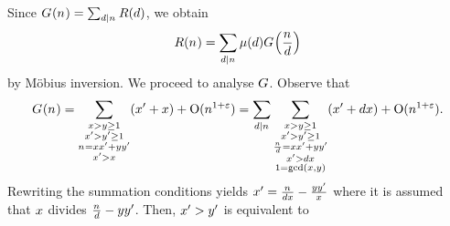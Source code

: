   Since %
  $\TheQuantityOf{\Size} =  \Sum[\TheDivisor\divides\Size]{
    \InvQuantityOf{\TheDivisor}
  }$,  
  we obtain
  \begin{equation}\label{mobius}
    \InvQuantityOf{\Size} =
    \Sum[\TheDivisor\divides\Size]{
      \MoebiusOf{\TheDivisor}
      \TheQuantityOf{\frac{\Size}{\TheDivisor}}
    }
  \end{equation}
  by Möbius inversion.  We proceed to analyse $G$. Observe that
  \begin{align*}\label{eq.break-symmetry}
    \TheQuantityOf{\Size}
    =
    \Sum[\substack{
    \LeftA > \RightA \geq 1 \\
    \LeftB > \RightB \geq 1 \\
    \Size = \LeftA\LeftB+\RightA\RightB \\
    \LeftB>\LeftA
    }]{(\LeftB+\LeftA)}
    +
    \BigO{\Size^{1 + \TheEpsilon}}
    =
    \Sum[\TheDivisor\divides\Size]{
    \Sum[\substack{
    \LeftA > \RightA \geq 1 \\
    \LeftB > \RightB \geq 1 \\
    \frac{\Size}{\TheDivisor} = \LeftA\LeftB+\RightA\RightB \\
    \LeftB>\TheDivisor\LeftA\\
    1=\gcdOf{\LeftA,\RightA}
    }]{(\LeftB+\TheDivisor\LeftA)}
    }
    +
    \BigO{\Size^{1 + \TheEpsilon}}
    .
  \end{align*}
  Rewriting the summation conditions yields $x'=
  \frac{n_{}}{dx} -\frac{yy'}{x}$ where
  it is assumed that $x$ divides $\frac{n_{}}{d}
  -yy'$. Then, $x'>y'$ is equivalent to
